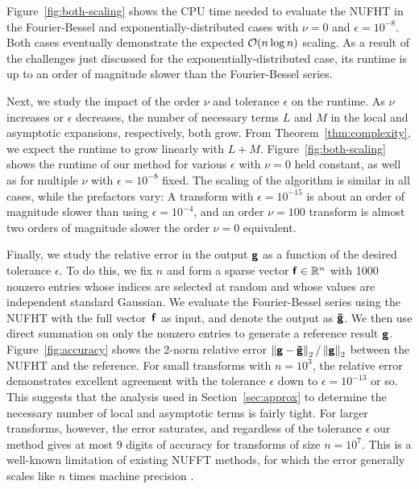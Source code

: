 Figure~\ref{fig:both-scaling} shows the CPU time needed to evaluate the NUFHT in
the Fourier-Bessel and exponentially-distributed cases with $\nu=0$ and
$\epsilon=10^{-8}$. Both cases eventually demonstrate the expected $\bO(n\log
n)$ scaling. As a result of the challenges just discussed for the
exponentially-distributed case, its runtime is up to an order of magnitude
slower than the Fourier-Bessel series.

Next, we study the impact of the order $\nu$ and tolerance $\epsilon$ on the
runtime. As $\nu$ increases or $\epsilon$ decreases, the number of necessary
terms $L$ and $M$ in the local and asymptotic expansions, respectively, both grow.
From Theorem~\ref{thm:complexity}, we expect the runtime to grow linearly with
$L + M$. Figure~\ref{fig:both-scaling} shows the runtime of our method for
various $\epsilon$ with $\nu=0$ held constant, as well as for multiple $\nu$
with $\epsilon=10^{-8}$ fixed. The scaling of the algorithm is similar in all
cases, while the prefactors vary: A transform with $\epsilon = 10^{-15}$ is
about an order of magnitude slower than using $\epsilon = 10^{-4}$, and an order
$\nu=100$ transform is almost two orders of magnitude slower the order $\nu=0$
equivalent.

Finally, we study the relative error in the output $\vct{g}$ as a function of
the desired tolerance $\epsilon$. To do this, we fix $n$ and form a sparse
vector $\vct{f} \in \R^n$ with 1000 nonzero entries whose indices are selected
at random and whose values are independent standard Gaussian. We evaluate the
Fourier-Bessel series using the NUFHT with the full vector~$\vct{f}$ as input,
and denote the output as $\vct{\tilde{g}}$. We then use direct summation on only
the nonzero entries to generate a reference result $\vct{g}$.
Figure~\ref{fig:accuracy} shows the 2-norm relative error $\norm[2]{\vct{g} -
\vct{\tilde{g}}} / \norm[2]{\vct{g}}$ between the NUFHT and the reference. For
small transforms with $n=10^3$, the relative error demonstrates excellent
agreement with the tolerance $\epsilon$ down to $\epsilon = 10^{-13}$ or so.
This suggests that the analysis used in Section~\ref{sec:approx} to determine
the necessary number of local and asymptotic terms is fairly tight. For larger
transforms, however, the error saturates, and regardless of the tolerance
$\epsilon$ our method gives at most 9 digits of accuracy for transforms of size
$n=10^7$. This is a well-known limitation of existing NUFFT methods, for which
the error generally scales like $n$ times machine precision \cite[Remark
9]{barnett2019parallel}.


